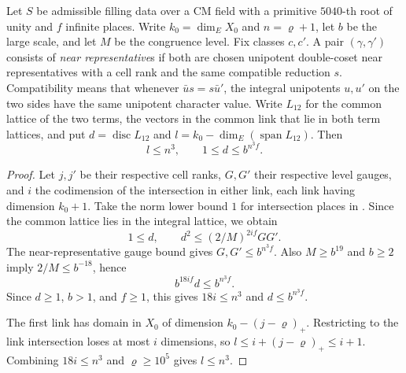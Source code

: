 \begin{lemma}
\label{lem:b-pair-corank}
\emitthmsource
Let $S$ be admissible filling data over a CM field with a primitive $5040$-th root of unity and $f$ infinite places.
Write $k_0=\dim_E X_0$ and $n=\varrho+1$, let $b$ be the large scale, and let $M$ be the congruence level.
Fix classes $c,c'$. A pair $(\gamma,\gamma')$ consists of \emph{near representative}s if both are chosen unipotent double-coset near representatives
with a cell rank and the same compatible reduction $s$. Compatibility means that whenever $\bar u s=s\bar u'$,
the integral unipotents $u,u'$ on the two sides have the same unipotent character value.
Write $L_{12}$ for the common lattice of the two terms, the vectors in the common link that lie in both term lattices,
and put $d=\operatorname{disc}L_{12}$ and $l=k_0-\dim_E(\operatorname{span}L_{12})$.
Then
\[
  l\le n^3,\qquad 1\le d\le b^{n^3 f}.
\]
\end{lemma}
\begin{proof}
Let $j,j'$ be their respective cell ranks, $G,G'$ their respective level gauges,
and $i$ the codimension of the intersection in either link, each link having dimension $k_0+1$.
Take the norm lower bound $1$ for intersection places in . Since the common lattice lies in the integral lattice, we obtain
\[
 1\le d,\qquad
 d^2\le (2/M)^{2if}GG'.
\]
The near-representative gauge bound gives $G,G'\le b^{n^3 f}$.
Also $M\ge b^{19}$ and $b\ge2$ imply $2/M\le b^{-18}$, hence
\[
  b^{18if}d\le b^{n^3 f}.
\]
Since $d\ge1$, $b>1$, and $f\ge1$, this gives $18i\le n^3$ and $d\le b^{n^3 f}$.

The first link has domain in $X_0$ of dimension $k_0-(j-\varrho)_+$.
Restricting to the link intersection loses at most $i$ dimensions, so
$l\le i+(j-\varrho)_+\le i+1$.
Combining $18i\le n^3$ and $\varrho\ge10^5$ gives $l\le n^3$.
\end{proof}

